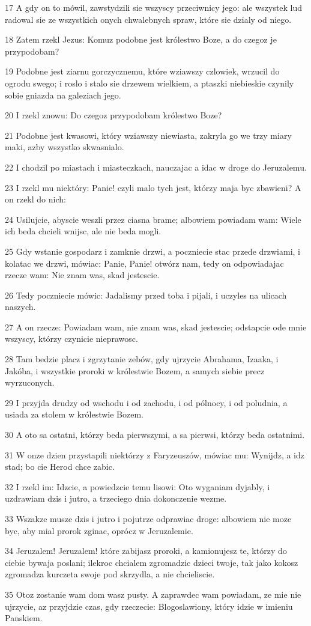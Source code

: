 \par 17 A gdy on to mówil, zawstydzili sie wszyscy przeciwnicy jego: ale wszystek lud radowal sie ze wszystkich onych chwalebnych spraw, które sie dzialy od niego.
\par 18 Zatem rzekl Jezus: Komuz podobne jest królestwo Boze, a do czegoz je przypodobam?
\par 19 Podobne jest ziarnu gorczycznemu, które wziawszy czlowiek, wrzucil do ogrodu swego; i roslo i stalo sie drzewem wielkiem, a ptaszki niebieskie czynily sobie gniazda na galeziach jego.
\par 20 I rzekl znowu: Do czegoz przypodobam królestwo Boze?
\par 21 Podobne jest kwasowi, który wziawszy niewiasta, zakryla go we trzy miary maki, azby wszystko skwasnialo.
\par 22 I chodzil po miastach i miasteczkach, nauczajac a idac w droge do Jeruzalemu.
\par 23 I rzekl mu niektóry: Panie! czyli malo tych jest, którzy maja byc zbawieni? A on rzekl do nich:
\par 24 Usilujcie, abyscie weszli przez ciasna brame; albowiem powiadam wam: Wiele ich beda chcieli wnijsc, ale nie beda mogli.
\par 25 Gdy wstanie gospodarz i zamknie drzwi, a poczniecie stac przede drzwiami, i kolatac we drzwi, mówiac: Panie, Panie! otwórz nam, tedy on odpowiadajac rzecze wam: Nie znam was, skad jestescie.
\par 26 Tedy poczniecie mówic: Jadalismy przed toba i pijali, i uczyles na ulicach naszych.
\par 27 A on rzecze: Powiadam wam, nie znam was, skad jestescie; odstapcie ode mnie wszyscy, którzy czynicie nieprawosc.
\par 28 Tam bedzie placz i zgrzytanie zebów, gdy ujrzycie Abrahama, Izaaka, i Jakóba, i wszystkie proroki w królestwie Bozem, a samych siebie precz wyrzuconych.
\par 29 I przyjda drudzy od wschodu i od zachodu, i od pólnocy, i od poludnia, a usiada za stolem w królestwie Bozem.
\par 30 A oto sa ostatni, którzy beda pierwszymi, a sa pierwsi, którzy beda ostatnimi.
\par 31 W onze dzien przystapili niektórzy z Faryzeuszów, mówiac mu: Wynijdz, a idz stad; bo cie Herod chce zabic.
\par 32 I rzekl im: Idzcie, a powiedzcie temu lisowi: Oto wyganiam dyjably, i uzdrawiam dzis i jutro, a trzeciego dnia dokonczenie wezme.
\par 33 Wszakze musze dzis i jutro i pojutrze odprawiac droge: albowiem nie moze byc, aby mial prorok zginac, oprócz w Jeruzalemie.
\par 34 Jeruzalem! Jeruzalem! które zabijasz proroki, a kamionujesz te, którzy do ciebie bywaja poslani; ilekroc chcialem zgromadzic dzieci twoje, tak jako kokosz zgromadza kurczeta swoje pod skrzydla, a nie chcieliscie.
\par 35 Otoz zostanie wam dom wasz pusty. A zaprawdec wam powiadam, ze mie nie ujrzycie, az przyjdzie czas, gdy rzeczecie: Blogoslawiony, który idzie w imieniu Panskiem.

